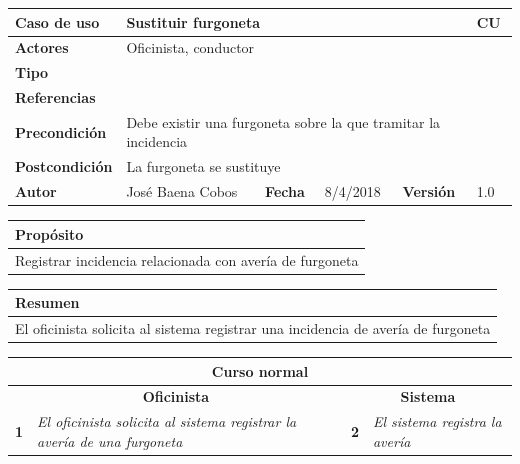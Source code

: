 \documentclass[12pt,spanish]{article}
\begin{document}
\begin{table}[H]
	\centering
	\begin{tabular}{|m{3cm}|m{4cm}|m{2cm}|m{2cm}|m{2cm}|m{1cm}|}
		\hline
		\textbf{Caso de uso} &  \multicolumn{4}{m{11cm}|}{Sustituir furgoneta} \vline &  \cellcolor{gray!40}CU\arabic{contadorCU}  \stepcounter{contadorCU} \\
		\hline
		\textbf{Actores} & \multicolumn{5}{m{11cm}|}{Oficinista, conductor} \\
		\hline
		\textbf{Tipo} & \multicolumn{5}{m{11cm}|}{} \\
		\hline
		\textbf{Referencias} &\multicolumn{5}{m{11cm}|}{} \\
		\hline
		\textbf{Precondición} & \multicolumn{5}{m{11cm}|}{Debe existir una furgoneta sobre la que tramitar la incidencia} \\
		\hline
		\textbf{Postcondición} & \multicolumn{5}{m{11cm}|}{La furgoneta se sustituye} \\
		\hline
		\textbf{Autor} & José Baena Cobos & \textbf{Fecha} & 8/4/2018 & \textbf{Versión} & 1.0 \\
		\hline
	\end{tabular}
	
	\vspace{1cm}
	
	\begin{tabular}{|m{16.2cm}|}
		\hline
		\textbf{Propósito} \\
		\hline
		Registrar incidencia relacionada con avería de furgoneta\\
		\hline
	\end{tabular}
	
	\vspace{1cm}
	
	\begin{tabular}{|m{16.2cm}|}
		\hline
		\textbf{Resumen} \\
		\hline
		El oficinista solicita al sistema registrar una incidencia de avería de furgoneta\\
		\hline
	\end{tabular}
	
	\vspace{1cm}
	
	\begin{tabular}{|m{5pt}|m{7.33cm}|m{5pt}|m{7.33cm}|}
		\hline
		\multicolumn{4}{|c|}{\textbf{Curso normal}} \\
		\hline
		\multicolumn{2}{|c}{\textbf{Oficinista}} & \multicolumn{2}{|c|}{\textbf{Sistema}} \\
		\hline
		\textbf{1} & \textit{El oficinista solicita al sistema registrar la avería de una furgoneta} & \textbf{2} & \textit{El sistema registra la avería} \\
		\hline
	

\end{tabular}
\end{table}
\end{document}
